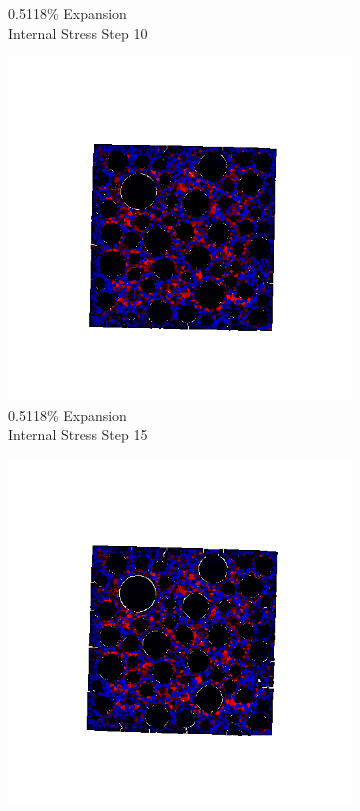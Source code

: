 \begin{figure}[ht!]
\begin{subfigure}{.25\textwidth}
      \caption{0.5118\% Expansion\\Internal Stress Step 10}
    \end{subfigure}%
    \begin{subfigure}{.25\textwidth}
      \centering
      \includegraphics[width=1.0\linewidth]{Files/exp_3D/DEF/A30X-5C_3_s15.png}
      \caption{0.5118\% Expansion\\Internal Stress Step 15}
    \end{subfigure}%
    \begin{subfigure}{.25\textwidth}
      \centering
      \includegraphics[width=1.0\linewidth]{Files/exp_3D/DEF/A30X-5C_3_stress.png}

\end{subfigure}
\end{figure}
